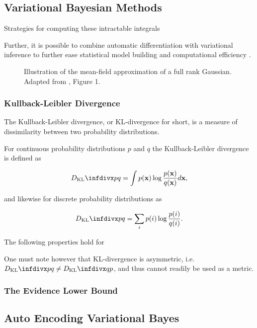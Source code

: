 \subsection{Variational Bayesian Methods}
\label{subsection:variational_inference}

Strategies for computing these intractable integrals 

Further, it is possible to combine automatic differentiation with variational inference to further ease statistical model building and computational efficiency \cite{advi}.

\begin{figure}[!htb]
  \centering
  \resizebox{0.5\textwidth}{!}{\unskip}
  \caption{Illustration of the mean-field approximation of a full rank Gaussian. Adapted from \cite{variational_inference_review}, Figure 1.}
  \label{fig:mean_field_approximation}
\end{figure}

\subsubsection{Kullback-Leibler Divergence}

The Kullback-Leibler divergence, or KL-divergence for short, is a measure of dissimilarity between two probability distributions.

For continuous probability distributions $p$ and $q$ the Kullback-Leibler divergence is defined as

$$\dkl{p}{q} = \int p(\mathbf{x}) \log \frac{p(\mathbf{x})}{q(\mathbf{x})} d\mathbf{x},$$

and likewise for discrete probability distributions as

$$\dkl{p}{q} = \sum_{i} p(i) \log \frac{p(i)}{q(i)}.$$

The following properties hold for 

One must note however that KL-divergence is asymmetric, i.e. $\dkl{p}{q} \neq \dkl{q}{p}$, and thus cannot readily be used as a metric.

\subsubsection{The Evidence Lower Bound}

\newpage

\subsection{Auto Encoding Variational Bayes}

